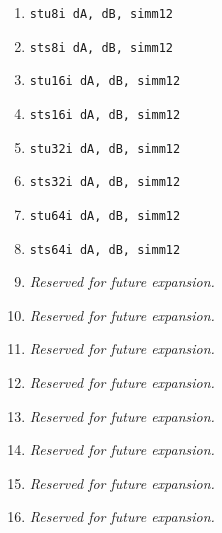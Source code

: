 \documentclass{article}
\begin{document}
\begin{itemize}
\begin{enumerate}
			\item \texttt{stu8i dA, dB, simm12}
			\item \texttt{sts8i dA, dB, simm12}
			\item \texttt{stu16i dA, dB, simm12}
			\item \texttt{sts16i dA, dB, simm12}

			\item \texttt{stu32i dA, dB, simm12}
			\item \texttt{sts32i dA, dB, simm12}
			\item \texttt{stu64i dA, dB, simm12}
			\item \texttt{sts64i dA, dB, simm12}

			\item \textit{Reserved for future expansion.}
			\item \textit{Reserved for future expansion.}
			\item \textit{Reserved for future expansion.}
			\item \textit{Reserved for future expansion.}

			\item \textit{Reserved for future expansion.}
			\item \textit{Reserved for future expansion.}
			\item \textit{Reserved for future expansion.}
			\item \textit{Reserved for future expansion.}
			\end{enumerate}
		\end{itemize}
		\newpage
\end{document}
